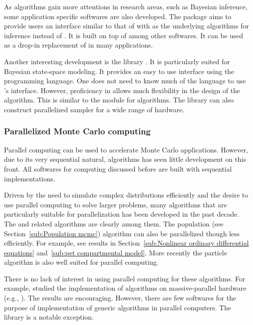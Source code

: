 As \smc algorithms gain more attentions in research areas, such as Bayesian inference, some application specific softwares are also developed. The \biips \cite{biips} package aims to provide users an interface similar to that of \bugs with \smc as the underlying algorithms for inference instead of \mcmc. It is built on top of \smctc among other softwares. It can be used as a drop-in replacement of \bugs in many applications.

Another interesting development is the \libbi library \cite{libbi}. It is particularly suited for Bayesian state-space modeling. It provides an easy to use interface using the \perl programming language. One does not need to know much of the language to use \libbi's interface. However, proficiency in \perl allows much flexibility in the design of the algorithm. This is similar to the \pymc module for \mcmc algorithms. The library can also construct parallelized sampler for a wide range of hardware.

\subsubsection{Parallelized Monte Carlo computing}
\label{ssub:Parallelized Monte Carlo computing}

Parallel computing can be used to accelerate Monte Carlo applications. However, due to its very sequential natural, \mcmc algorithms has seen little development on this front. All softwares for \mcmc computing discussed before are built with sequential implementations.

Driven by the need to simulate complex distributions efficiently and the desire to use parallel computing to solve larger problems, many algorithms that are particularly suitable for parallelization has been developed in the past decade. The \smc and related algorithms are clearly among them. The population \mcmc (see Section~\ref{sub:Population mcmc}) algorithm can also be parallelized though less efficiently. For example, see results in Section~\ref{sub:Nonlinear ordinary differential equations} and~\ref{sub:pet compartmental model}. More recently the particle \mcmc algorithm \cite{Andrieu:2010gc} is also well suited for parallel computing.

There is no lack of interest in using parallel computing for these algorithms. For example, \cite{Lee:2010fm} studied the implementation of \smc algorithms on massive-parallel hardware (e.g., \gpu). The results are encouraging. However, there are few softwares for the purpose of implementation of generic \smc algorithms in parallel computers. The \libbi library is a notable exception.


